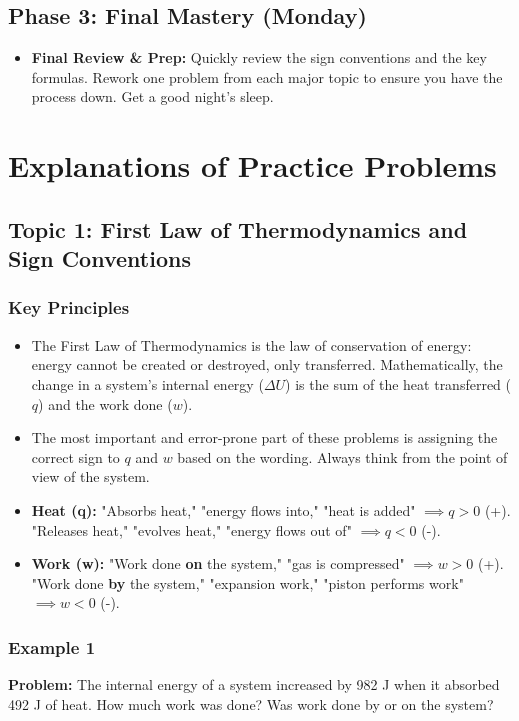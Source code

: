 \documentclass{article}
\begin{document}
\subsection{Phase 3: Final Mastery (Monday)}
\begin{itemize}
    \item \textbf{Final Review \& Prep:} Quickly review the sign conventions and the key formulas. Rework one problem from each major topic to ensure you have the process down. Get a good night's sleep.
\end{itemize}

\section{Explanations of Practice Problems}

\subsection{Topic 1: First Law of Thermodynamics and Sign Conventions}
\subsubsection{Key Principles}
\begin{itemize}
    \item The First Law of Thermodynamics is the law of conservation of energy: energy cannot be created or destroyed, only transferred. Mathematically, the change in a system's internal energy ($\Delta U$) is the sum of the heat transferred ($q$) and the work done ($w$).
    \item The most important and error-prone part of these problems is assigning the correct sign to $q$ and $w$ based on the wording. Always think from the point of view of the system.
    \item \textbf{Heat (q):} "Absorbs heat," "energy flows into," "heat is added" $\implies q > 0$ (+). "Releases heat," "evolves heat," "energy flows out of" $\implies q < 0$ (-).
    \item \textbf{Work (w):} "Work done \textbf{on} the system," "gas is compressed" $\implies w > 0$ (+). "Work done \textbf{by} the system," "expansion work," "piston performs work" $\implies w < 0$ (-).
\end{itemize}

\subsubsection{Example 1}
\textbf{Problem:} The internal energy of a system increased by 982 J when it absorbed 492 J of heat. How much work was done? Was work done by or on the system?
\end{document}
